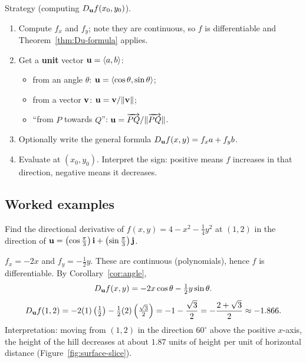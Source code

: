 \begin{strategy}{Strategy (computing $D_{\mathbf{u}} f(x_0,y_0)$).}
\begin{enumerate}
  \item Compute $f_x$ and $f_y$; note they are continuous, so $f$ is
        differentiable and Theorem~\ref{thm:Du-formula} applies.
  \item Get a \textbf{unit} vector $\mathbf{u}=\left\langle a,b \right\rangle$:
        \begin{itemize}
          \item from an angle $\theta$: $\mathbf{u}=\left\langle \cos\theta,\sin\theta \right\rangle$;
          \item from a vector $\mathbf{v}$: $\mathbf{u}=\mathbf{v}/\lVert\mathbf{v}\rVert$;
          \item ``from $P$ towards $Q$'': $\mathbf{u}=\overrightarrow{PQ}/\lVert\overrightarrow{PQ}\rVert$.
        \end{itemize}
  \item Optionally write the general formula $D_{\mathbf{u}} f(x,y)=f_x a+f_y b$.
  \item Evaluate at $(x_0,y_0)$. Interpret the sign: positive means $f$ increases
        in that direction, negative means it decreases.
\end{enumerate}
\end{strategy}

\subsection{Worked examples}

\begin{example}\label{ex:6.1}
Find the directional derivative of $f(x,y)=4-x^2-\tfrac14y^2$ at $(1,2)$ in the
direction of $\mathbf{u}=\left(\cos\tfrac\pi3\right)\mathbf{i}+\left(\sin\tfrac\pi3\right)\mathbf{j}$.
\end{example}
\begin{solution}
 $f_x=-2x$ and $f_y=-\tfrac12y$. These are
continuous (polynomials), hence $f$ is differentiable.
 By Corollary~\ref{cor:angle},
\[
  D_{\mathbf{u}} f(x,y)=-2x\cos\theta-\tfrac12y\sin\theta .
\]
\[
  D_{\mathbf{u}} f(1,2)=-2(1)\left(\tfrac12\right)-\tfrac12(2)\left(\tfrac{\sqrt3}{2}\right)
  =-1-\frac{\sqrt3}{2}=-\frac{2+\sqrt3}{2}\approx-1.866 .
\]
Interpretation: moving from $(1,2)$ in the direction $60^\circ$ above the
positive $x$-axis, the height of the hill decreases at about $1.87$ units of
height per unit of horizontal distance (Figure~\ref{fig:surface-slice}).
\end{solution}

